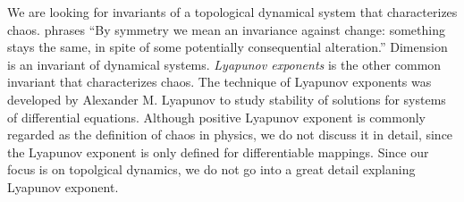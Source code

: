 \documentclass[10pt,twoside,draft]{book}
\begin{document}
We are looking for invariants of a topological dynamical system that characterizes chaos.
\citet[p.xiii-xv]{schroeder} phrases
``By symmetry we mean an invariance against change: something stays the same, in spite of some potentially consequential alteration.''
Dimension is an invariant of dynamical systems.
\textit{Lyapunov exponents} is the other common invariant that characterizes chaos.
The technique of Lyapunov exponents was developed by Alexander M. Lyapunov to study stability of solutions for systems of differential equations.
Although positive Lyapunov exponent is commonly regarded as the definition of chaos \citep{kantz-schreiber} in physics, we do not discuss it in detail, since the Lyapunov exponent is only defined for differentiable mappings.
Since our focus is on topolgical dynamics, we do not go into a great detail explaning Lyapunov exponent.
\end{document}
